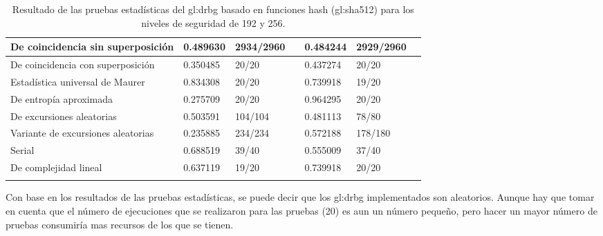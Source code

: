 \begin{longtable}{| m{2.4in} | C{0.65in} | C{0.85in} |
C{0.15in} | C{0.65in} | C{0.85in} | C{0.15in} |}
  De coincidencia sin superposición &
  0.489630 & 2934/2960 &  &
  0.484244 & 2929/2960 &  \\\hline

  De coincidencia con superposición &
  0.350485 &   20/20   &  &
  0.437274 &   20/20   &  \\\hline

  Estadística universal de Maurer &
  0.834308 &   20/20   &  &
  0.739918 &   19/20   &  \\\hline

  De entropía aproximada &
  0.275709 &   20/20   &  &
  0.964295 &   20/20   &  \\\hline

  De excursiones aleatorias &
  0.503591 &  104/104  &  &
  0.481113 &   78/80   &  \\\hline

  Variante de excursiones aleatorias &
  0.235885 &  234/234  &  &
  0.572188 &  178/180  &  \\\hline

  Serial &
  0.688519 &   39/40   &  &
  0.555009 &   37/40   &  \\\hline

  De complejidad lineal &
  0.637119 &   19/20   &  &
  0.739918 &   20/20   &  \\\hline

  \caption{Resultado de las pruebas estadísticas del \gls{gl:drbg} basado en
  funciones hash (\gls{gl:sha}512) para los niveles de seguridad de 192 y 256.}
  \label{resultados_pruebas_drbg_sha512_192_256}

\end{longtable}


Con base en los resultados de las pruebas estadísticas, se puede decir que
los \gls{gl:drbg} implementados son aleatorios. Aunque hay que tomar en cuenta
que el número de ejecuciones que se realizaron para las pruebas (20) es aun un
número pequeño, pero hacer un mayor número de pruebas consumiría mas recursos
de los que se tienen.
